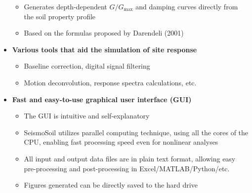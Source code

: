 \documentclass[11pt,letterpaper]{article}
\begin{document}
\begin{itemize}
        \begin{itemize}
            \item Generates depth-dependent $G/G_{\text{max}}$ and damping curves directly from the soil property profile
            \item Based on the formulas proposed by Darendeli (2001)
        \end{itemize}
    \item \textbf{\textsf{Various tools that aid the simulation of site response}}
        \begin{itemize}
            \item Baseline correction, digital signal filtering
            \item Motion deconvolution, response spectra calculations, etc.
        \end{itemize}
    \item \textbf{\textsf{Fast and easy-to-use graphical user interface (GUI)}}
        \begin{itemize}
            \item The GUI is intuitive and self-explanatory
            \item SeismoSoil utilizes parallel computing technique, using all the cores of the CPU, enabling fast processing speed even for nonlinear analyses
            \item All input and output data files are in plain text format, allowing easy pre-processing and post-processing in Excel/MATLAB/Python/etc.
            \item Figures generated can be directly saved to the hard drive
        \end{itemize}
\end{itemize}


\end{document}
